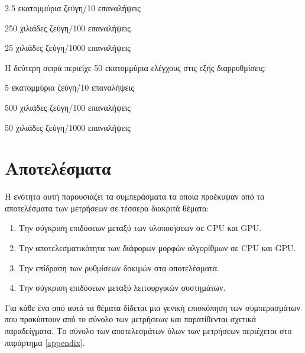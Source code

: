 \begin{enumerate*}
\item 2.5 εκατομμύρια ζεύγη/10 επαναλήψεις
\item 250 χιλιάδες ζεύγη/100 επαναλήψεις 
\item 25 χιλιάδες ζεύγη/1000 επαναλήψεις  
\end{enumerate*}

Η δεύτερη σειρά περιείχε 50 εκατομμύρια ελέγχους στις εξής διαρρυθμίσεις:

\begin{enumerate*}
\item 5 εκατομμύρια ζεύγη/10 επαναλήψεις
\item 500 χιλιάδες ζεύγη/100 επαναλήψεις 
\item 50 χιλιάδες ζεύγη/1000 επαναλήψεις   
\end{enumerate*}

\section{Αποτελέσματα}
\label{chapter:bench_interpret}
\noindent Η ενότητα αυτή παρουσιάζει τα συμπεράσματα τα οποία προέκυψαν από τα αποτελέσματα των μετρήσεων σε τέσσερα διακριτά θέματα:
\begin{enumerate}
\item Την σύγκριση επιδόσεων μεταξύ των υλοποιήσεων σε CPU και GPU.
\item Την αποτελεσματικότητα των διάφορων μορφών αλγορίθμων σε CPU και GPU.
\item Την επίδραση των ρυθμίσεων δοκιμών στα αποτελέσματα.
\item Την σύγκριση επιδόσεων μεταξύ λειτουργικών συστημάτων.
\end{enumerate} 

Για κάθε ένα από αυτά τα θέματα δίδεται μια γενική επισκόπηση των συμπερασμάτων που προκύπτουν από το σύνολο των μετρήσεων και παρατίθενται σχετικά παραδείγματα. Το σύνολο των αποτελεσμάτων όλων των μετρήσεων περιέχεται στο παράρτημα \ref{appendix}. 


